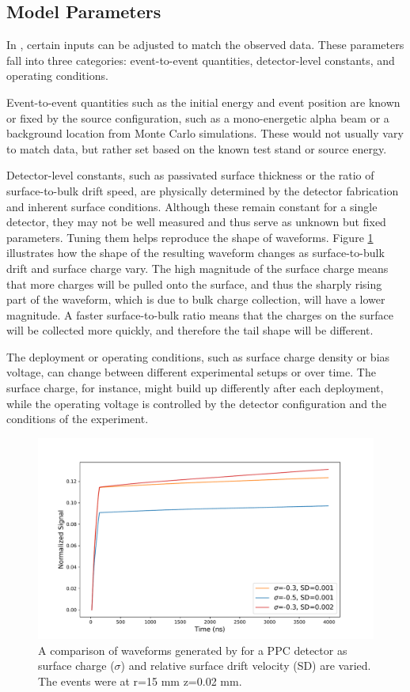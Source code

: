 \subsection{Model Parameters}
In {\ehd}, certain inputs can be adjusted to match the observed data. These parameters fall into three categories: event-to-event quantities, detector-level constants, and operating conditions.

Event-to-event quantities such as the initial energy and event position are known or fixed by the source configuration, such as a mono-energetic alpha beam or a background location from Monte Carlo simulations. These would not usually vary to match data, but rather set based on the known test stand or source energy.

Detector-level constants, such as passivated surface thickness or the ratio of surface-to-bulk drift speed, are physically determined by the detector fabrication and inherent surface conditions. Although these remain constant for a single detector, they may not be well measured and thus serve as unknown but fixed parameters. Tuning them helps reproduce the shape of waveforms. Figure \ref{fig:wf_comp} illustrates how the shape of the resulting waveform changes as surface-to-bulk drift and surface charge vary. The high magnitude of the surface charge means that more charges will be pulled onto the surface, and thus the sharply rising part of the waveform, which is due to bulk charge collection, will have a lower magnitude. A faster surface-to-bulk ratio means that the charges on the surface will be collected more quickly, and therefore the tail shape will be different.

The deployment or operating conditions, such as surface charge density or bias voltage, can change between different experimental setups or over time. The surface charge, for instance, might build up differently after each deployment, while the operating voltage is controlled by the detector configuration and the conditions of the experiment.

\begin{figure}%
    \includegraphics[trim={0.1cm 0.3cm 1.3cm 0.3cm},clip,width=0.99\linewidth]{ch3/figs/wf_comp.pdf}
    \caption{A comparison of waveforms generated by {\ehd} for a {\Ltwo} PPC detector as surface charge ($\sigma$) and relative surface drift velocity (SD) are varied. The events were at r=15 mm z=0.02 mm.}
    \label{fig:wf_comp}
\end{figure}


